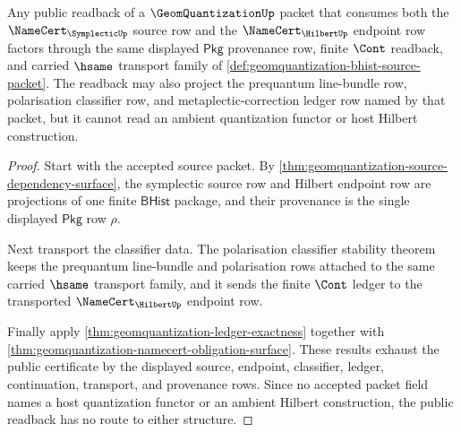 \begin{theorem}
\label{thm:geomquantization-shared-provenance-readback-exactness}
Any public readback of a $\GeomQuantizationUp$ packet that consumes both the
$\NameCert_{\SymplecticUp}$ source row and the $\NameCert_{\HilbertUp}$
endpoint row factors through the same displayed $\mathsf{Pkg}$ provenance row,
finite $\Cont$ readback, and carried $\hsame$ transport family of
\autoref{def:geomquantization-bhist-source-packet}. The readback may also
project the prequantum line-bundle row, polarisation classifier row, and
metaplectic-correction ledger row named by that packet, but it cannot read an
ambient quantization functor or host Hilbert construction.
\end{theorem}
\begin{proof}
Start with the accepted source packet. By
\autoref{thm:geomquantization-source-dependency-surface}, the symplectic source
row and Hilbert endpoint row are projections of one finite $\mathsf{BHist}$
package, and their provenance is the single displayed $\mathsf{Pkg}$ row
$\rho$.

Next transport the classifier data. The polarisation classifier stability
theorem keeps the prequantum line-bundle and polarisation rows attached to the
same carried $\hsame$ transport family, and it sends the finite $\Cont$ ledger
to the transported $\NameCert_{\HilbertUp}$ endpoint row.

Finally apply \autoref{thm:geomquantization-ledger-exactness} together with
\autoref{thm:geomquantization-namecert-obligation-surface}. These results
exhaust the public certificate by the displayed source, endpoint, classifier,
ledger, continuation, transport, and provenance rows. Since no accepted packet
field names a host quantization functor or an ambient Hilbert construction,
the public readback has no route to either structure.
\end{proof}

